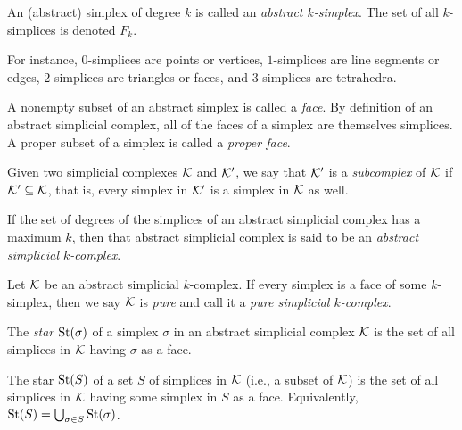 \begin{definition}\label{def:k_simplices}
    \leanok
    An (abstract) simplex of degree $k$ is called an \emph{abstract $k$-simplex}. The set of all $k$-simplices is denoted $F_k$. %
\end{definition}
For instance, $0$-simplices are points or vertices, $1$-simplices are line segments or edges, $2$-simplices are triangles or faces, and $3$-simplices are tetrahedra. %

A nonempty subset of an abstract simplex is called a \emph{face}. By definition of an abstract simplicial complex, all of the faces of a simplex are themselves simplices. A proper subset of a simplex is called a \emph{proper face}.

\begin{definition}\label{def:subcomplex}
    \leanok
    Given two simplicial complexes $\mathcal{K}$ and $\mathcal{K}'$, we say that $\mathcal{K}'$ is a \emph{subcomplex} of $\mathcal{K}$ if $\mathcal{K}' \subseteq \mathcal{K}$, that is, every simplex in $\mathcal{K}'$ is a simplex in $\mathcal{K}$ as well.
\end{definition}

\begin{definition}\label{def:abstract_simplicial_k-complex}
    If the set of degrees of the simplices of an abstract simplicial complex has a maximum $k$, then that abstract simplicial complex is said to be an \emph{abstract simplicial $k$-complex}.
\end{definition}

\begin{definition}\label{def:pure_abstract_simplicial_k-complex}
    Let $\mathcal{K}$ be an abstract simplicial $k$-complex. If every simplex is a face of some $k$-simplex, then we say $\mathcal{K}$ is \emph{pure} and call it a \emph{pure simplicial $k$-complex}.
\end{definition}

\begin{definition}\label{def:star}
    \leanok
    The \emph{star} $\operatorname{St}(\sigma)$ of a simplex $\sigma$ in an abstract simplicial complex $\mathcal{K}$ is the set of all simplices in $\mathcal{K}$ having $\sigma$ as a face.

    The star $\operatorname{St}(S)$ of a set $S$ of simplices in $\mathcal{K}$ (i.e., a subset of $\mathcal{K}$) is the set of all simplices in $\mathcal{K}$ having some simplex in $S$ as a face. Equivalently, $\operatorname{St}(S) = \bigcup_{\sigma \in S} \operatorname{St}(\sigma)$.
\end{definition}

